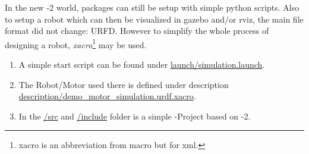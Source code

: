 
In the new -2 world, packages can still be setup with simple python scripts.
Also to setup a robot which can then be visualized in \Gls{gazebo} and/or \Gls{rviz}, the main file format did not change: URFD.
However to simplify the whole process of designing a robot, \textit{xacro}\footnote{xacro is an abbreviation from macro but for xml.} may be used.


\begin{enumerate}
    \item A simple start script can be found under \href{https://github.com/LukyLuke/mse_vt_eeros/blob/main/src/demo_package/launch/simulation.launch.py}{launch/simulation.launch}.

    \item The Robot/Motor used there is defined under description \\ \href{https://github.com/LukyLuke/mse_vt_eeros/blob/main/src/demo_package/description/demo_motor_simulation.urdf.xacro}{description/demo\_motor\_simulation.urdf.xacro}.

    \item In the \href{https://github.com/LukyLuke/mse_vt_eeros/tree/main/src/demo_package/src}{/src} and \href{https://github.com/LukyLuke/mse_vt_eeros/tree/main/src/demo_package/include/demo_package}{/include} folder is a simple -Project based on -2.
\end{enumerate}


